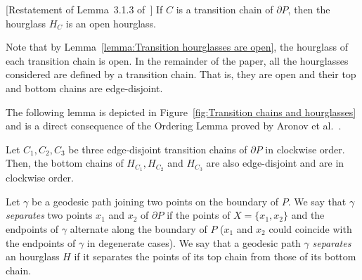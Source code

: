 \documentclass[a4paper,UKenglish]{lipics}
\begin{document}
\begin{lemma}\label{lemma:Transition hourglasses are open}
[Restatement of Lemma~3.1.3 of~\cite{aronov1993furthest}] 
If $C$ is a transition chain of $\partial P$, then the hourglass $H_C$ is an open hourglass.
\end{lemma}

Note that by Lemma~\ref{lemma:Transition hourglasses are open}, the hourglass of each transition chain is open.
In the remainder of the paper, all the hourglasses considered are defined by a transition chain. That is, they are open and their top and bottom chains are edge-disjoint.

The following lemma is depicted in Figure~\ref{fig:Transition chains and hourglasses} and is a direct consequence of the Ordering Lemma proved by Aronov et al.~\cite[Corollary 2.7.4]{aronov1993furthest}.
\begin{lemma}\label{lemma:Ordering Lemma}
Let $C_1, C_2, C_3$ be three edge-disjoint transition chains of $\partial P$ in clockwise order. Then, the bottom chains of $H_{C_1}, H_{C_2}$ and $H_{C_3}$ are also edge-disjoint and are in clockwise order.
\end{lemma}

Let $\gamma$ be a  geodesic path joining two points on the boundary of $P$.
We say that $\gamma$ \emph{separates} two points $x_1$ and $x_2$ of $\partial P$ if the points of $X=\{x_1, x_2\}$ and the endpoints of $\gamma$ alternate along the boundary of $P$ ($x_1$ and $x_2$ could coincide with the endpoints of $\gamma$ in degenerate cases). We say that a geodesic path $\gamma$ \emph{separates} an hourglass $H$ if it separates the points of its top chain from those of its  bottom chain.
\end{document}
